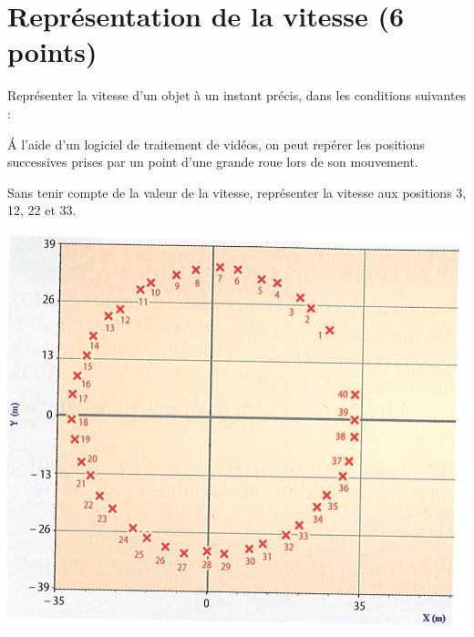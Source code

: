 \section{Représentation de la vitesse (6 points)}

\begin{questions}
	\question Représenter la vitesse d'un objet à un instant précis, dans les conditions suivantes  :
	

	\question[2] \'A l'aide d'un logiciel de traitement de vidéos, on peut repérer les positions successives prises par un point d'une grande roue lors de son mouvement.
	
	Sans tenir compte de la valeur de la vitesse, représenter la vitesse aux positions 3, 12, 22 et 33.
	
	\begin{center}
		\includegraphics[scale=0.45]{roue}
	\end{center}
\end{questions}